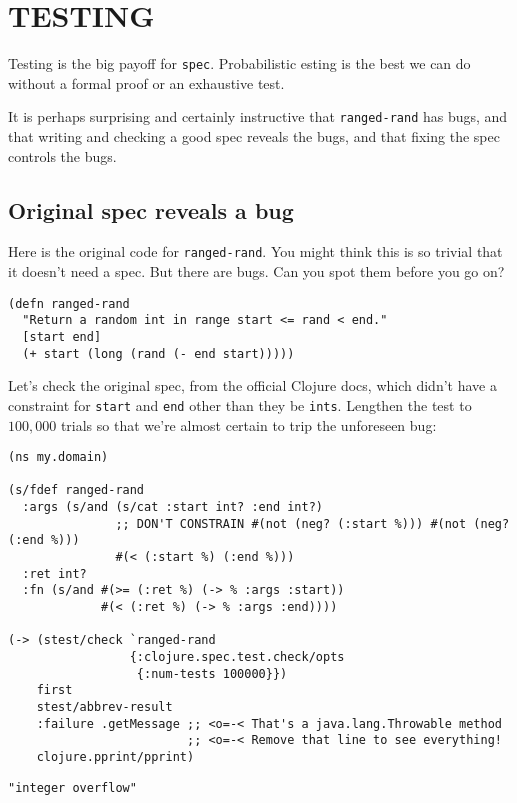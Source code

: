 \documentclass[10pt,oneside,x11names]{article}
\begin{document}
\section{TESTING}
\label{sec:org1550f3b}
\label{sec:testing}

Testing is the big payoff for \texttt{spec}. Probabilistic esting is the best we can do
without a formal proof or an exhaustive test.

It is perhaps surprising and certainly instructive that \texttt{ranged-rand} has bugs,
and that writing and checking a good spec reveals the bugs, and that fixing the
spec controls the bugs.

\subsection{Original spec reveals a bug}
\label{sec:org361d8fe}

Here is the original code for \texttt{ranged-rand}. You might think this is so trivial
that it doesn't need a spec. But there are bugs. Can you spot them before you go
on?

\begin{verbatim}
(defn ranged-rand
  "Return a random int in range start <= rand < end."
  [start end]
  (+ start (long (rand (- end start)))))
\end{verbatim}

Let's check the original spec, from the official Clojure docs, which didn't have
a constraint for \texttt{start} and \texttt{end} other than they be \texttt{ints}. Lengthen the test
to \(100,000\) trials so that we're almost certain to trip the unforeseen bug:

\begin{verbatim}
(ns my.domain)

(s/fdef ranged-rand
  :args (s/and (s/cat :start int? :end int?)
               ;; DON'T CONSTRAIN #(not (neg? (:start %))) #(not (neg? (:end %)))
               #(< (:start %) (:end %)))
  :ret int?
  :fn (s/and #(>= (:ret %) (-> % :args :start))
             #(< (:ret %) (-> % :args :end))))

(-> (stest/check `ranged-rand
                 {:clojure.spec.test.check/opts
                  {:num-tests 100000}})
    first
    stest/abbrev-result
    :failure .getMessage ;; <o=-< That's a java.lang.Throwable method
                         ;; <o=-< Remove that line to see everything!
    clojure.pprint/pprint)
\end{verbatim}

\begin{verbatim}
"integer overflow"
\end{verbatim}
\end{document}
